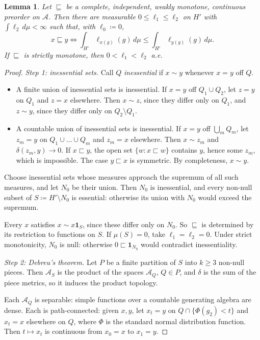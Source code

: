 \documentclass[11pt]{article}
\newtheorem{lemma}[theorem]{Lemma}
\theoremstyle{remark}\newtheorem{remark}[theorem]{Remark}
\newcommand{\Ascr}{\mathcal A}
\newcommand{\one}{\mathbf 1}
\begin{document}
\begin{lemma}\label{lem:debreu}
Let $\sqsubseteq$ be a complete, independent, weakly monotone, continuous
preorder on $\Ascr$. Then there are measurable $0\le\ell_1\le\ell_2$ on $H'$
with $\int\ell_2\,d\mu<\infty$ such that, with $\ell_0\coloneqq0$,
\[
 x\sqsubseteq y\iff\int_{H'}\ell_{x(g)}(g)\,d\mu\le\int_{H'}\ell_{y(g)}(g)\,d\mu .
\]
If $\sqsubseteq$ is strictly monotone, then $0<\ell_1<\ell_2$ a.e.
\end{lemma}
\begin{proof}
\emph{Step 1: inessential sets.} Call $Q$ \emph{inessential} if $x\sim y$
whenever $x=y$ off $Q$.
\begin{itemize}[leftmargin=*,itemsep=2pt]
\item A finite union of inessential sets is inessential. If $x=y$ off
$Q_1\cup Q_2$, let $z=y$ on $Q_1$ and $z=x$ elsewhere. Then $x\sim z$, since
they differ only on $Q_1$, and $z\sim y$, since they differ only on
$Q_2\setminus Q_1$.
\item A countable union of inessential sets is inessential. If $x=y$ off
$\bigcup_mQ_m$, let $z_m=y$ on $Q_1\cup\dots\cup Q_m$ and $z_m=x$ elsewhere. Then
$x\sim z_m$ and $\delta(z_m,y)\to0$. If $x\sqsubset y$, the open set
$\{w:x\sqsubset w\}$ contains $y$, hence some $z_m$, which is impossible.
The case $y\sqsubset x$ is symmetric. By completeness, $x\sim y$.
\end{itemize}
Choose inessential sets whose measures approach the supremum of all such
measures, and let $N_0$ be their union. Then $N_0$ is inessential, and every
non-null subset of $S\coloneqq H'\setminus N_0$ is essential: otherwise its
union with $N_0$ would exceed the supremum.

Every $x$ satisfies $x\sim x\one_S$, since these differ only on $N_0$. So
$\sqsubseteq$ is determined by its restriction to functions on $S$. If
$\mu(S)=0$, take $\ell_1=\ell_2=0$. Under strict monotonicity, $N_0$ is null:
otherwise $0\sqsubset\one_{N_0}$ would contradict inessentiality.

\emph{Step 2: Debreu's theorem.} Let $P$ be a finite partition of $S$ into
$k\ge3$ non-null pieces. Then $\Ascr_S$ is the product of the spaces
$\Ascr_Q$, $Q\in P$, and $\delta$ is the sum of the piece metrics, so it
induces the product topology.

Each $\Ascr_Q$ is separable: simple functions over a countable generating
algebra are dense. Each is path-connected: given $x,y$, let
$x_t=y$ on $Q\cap\{\Phi(g_2)<t\}$ and $x_t=x$ elsewhere on $Q$, where $\Phi$ is
the standard normal distribution function. Then $t\mapsto x_t$ is continuous
from $x_0=x$ to $x_1=y$.


\end{proof}
\end{document}
